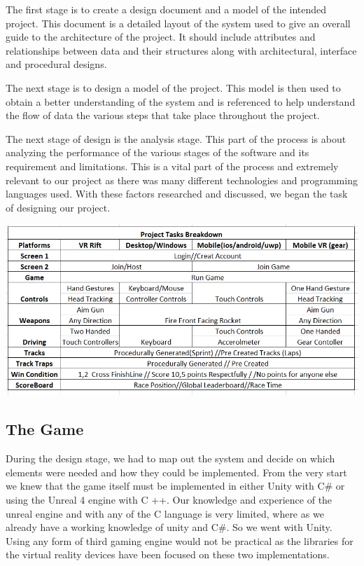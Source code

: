 The first stage is to create a design document and a model of the intended project. This document is a detailed layout of the system used to give an overall guide to the architecture of the project.
It should include attributes and relationships between data and their structures along with architectural, interface and procedural designs.
\newline

The next stage is to design a model of the project. This model is then used to obtain a better understanding of the system and is referenced to help understand the flow of data the various steps that take place throughout the project. 
\cite {36160220110101}

\newline

The next stage of design is the analysis stage. This part of the process is about analyzing the performance of the various stages of the software and its requirement and limitations. This is a vital part of the process and extremely relevant to our project as there was many different technologies and programming languages used. With these factors researched and discussed, we began the task of designing our project.
\newline

\includegraphics[width=1\columnwidth]{img/breakdown.PNG}

\subsection {The Game}
During the design stage, we had to map out the system and decide on which elements were needed and how they could be implemented. From the very start we knew that the game itself must be implemented in either Unity with C\# or using the Unreal 4 engine with C ++. Our knowledge and experience of the unreal engine and with any of the C language is very limited, where as we already have a working knowledge of unity and C\#. So we went with Unity. Using any form of third gaming engine would not be practical as the libraries for the virtual reality devices have been focused on these two implementations.\newline

